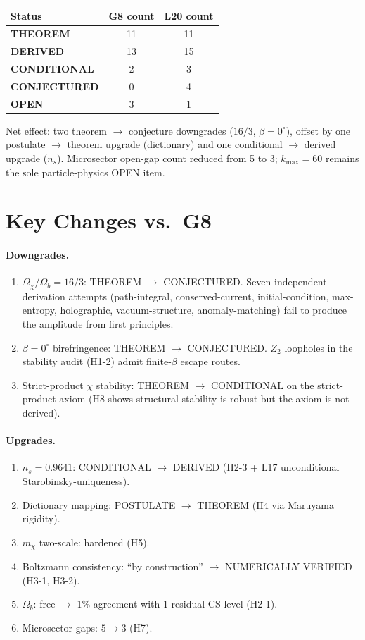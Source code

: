 \documentclass[11pt]{article}
\newcommand{\THM}{\textcolor{thmcol}{\textbf{THEOREM}}}
\newcommand{\DER}{\textcolor{dercol}{\textbf{DERIVED}}}
\newcommand{\CON}{\textcolor{condcol}{\textbf{CONDITIONAL}}}
\newcommand{\CNJ}{\textcolor{conjcol}{\textbf{CONJECTURED}}}
\newcommand{\OPN}{\textcolor{opencol}{\textbf{OPEN}}}
\begin{document}
\begin{tabular}{lcc}
\toprule
Status & G8 count & L20 count \\
\midrule
\THM      & 11 & 11 \\
\DER      & 13 & 15 \\
\CON      & 2  & 3  \\
\CNJ      & 0  & 4  \\
\OPN      & 3  & 1  \\
\bottomrule
\end{tabular}

\vspace{0.5em}
\noindent Net effect: two theorem $\to$ conjecture downgrades ($16/3$, $\beta{=}0^\circ$), offset by one postulate $\to$ theorem upgrade (dictionary) and one conditional $\to$ derived upgrade ($n_s$). Microsector open-gap count reduced from 5 to 3; $k_{\max}{=}60$ remains the sole particle-physics OPEN item.

\section*{Key Changes vs.\ G8}

\paragraph{Downgrades.}
\begin{enumerate}\itemsep1pt
  \item $\Omega_\chi/\Omega_b = 16/3$: THEOREM $\to$ CONJECTURED. Seven independent derivation attempts (path-integral, conserved-current, initial-condition, max-entropy, holographic, vacuum-structure, anomaly-matching) fail to produce the amplitude from first principles.
  \item $\beta = 0^\circ$ birefringence: THEOREM $\to$ CONJECTURED. $Z_2$ loopholes in the stability audit (H1-2) admit finite-$\beta$ escape routes.
  \item Strict-product $\chi$ stability: THEOREM $\to$ CONDITIONAL on the strict-product axiom (H8 shows structural stability is robust but the axiom is not derived).
\end{enumerate}

\paragraph{Upgrades.}
\begin{enumerate}\itemsep1pt
  \item $n_s = 0.9641$: CONDITIONAL $\to$ DERIVED (H2-3 + L17 unconditional Starobinsky-uniqueness).
  \item Dictionary mapping: POSTULATE $\to$ THEOREM (H4 via Maruyama rigidity).
  \item $m_\chi$ two-scale: hardened (H5).
  \item Boltzmann consistency: ``by construction'' $\to$ NUMERICALLY VERIFIED (H3-1, H3-2).
  \item $\Omega_b$: free $\to$ 1\% agreement with 1 residual CS level (H2-1).
  \item Microsector gaps: $5 \to 3$ (H7).
\end{enumerate}
\end{document}
